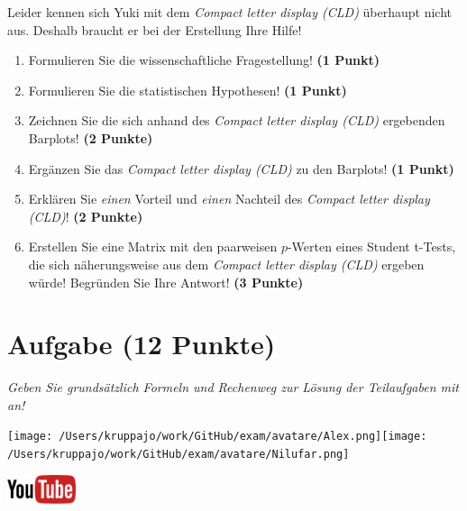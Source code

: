 \documentclass[a4paper, 9pt]{scrartcl}\usepackage[]{graphicx}\usepackage[]{xcolor}
\begin{document}
Leider kennen sich Yuki mit dem \textit{Compact letter display (CLD)} überhaupt nicht aus. Deshalb braucht er bei der Erstellung Ihre Hilfe!

\begin{enumerate}
  \item Formulieren Sie die wissenschaftliche Fragestellung! \textbf{(1 Punkt)}
  \item Formulieren Sie die statistischen Hypothesen! \textbf{(1 Punkt)}
\item Zeichnen Sie die sich anhand des \textit{Compact letter display (CLD)} ergebenden Barplots! \textbf{(2 Punkte)}
\item Ergänzen Sie das \textit{Compact letter display (CLD)} zu den Barplots! \textbf{(1 Punkt)}
\item Erklären Sie \textit{einen} Vorteil und \textit{einen} Nachteil des \textit{Compact letter display (CLD)}! \textbf{(2 Punkte)}
\item Erstellen Sie eine Matrix mit den paarweisen $p$-Werten eines Student t-Tests, die sich näherungsweise aus dem \textit{Compact letter display (CLD)} ergeben würde! Begründen Sie Ihre Antwort! \textbf{(3 Punkte)}
\end{enumerate}

 
\clearpage

\section{Aufgabe \hfill (12 Punkte)}

\textit{Geben Sie grundsätzlich Formeln und Rechenweg zur Lösung der Teilaufgaben mit an!} \\[1Ex]
 

 
\ifcollection
\begin{flushright}
\tiny\vspace{-3Ex}
\textbf{\examinhaltstart}
\exammodulebiostat
\vspace{-4Ex}
\end{flushright}
\begin{minipage}[t]{0.5\textwidth}
\texttt{[image: /Users/kruppajo/work/GitHub/exam/avatare/Alex.png]}\hspace{-4mm}\texttt{[image: /Users/kruppajo/work/GitHub/exam/avatare/Nilufar.png]}
\end{minipage}
\begin{minipage}[t]{0.5\textwidth}
\hfill
\href{https://youtu.be/kHmfEmU6lrk}{\includegraphics[width = 2cm]{img/youtube}}
\end{minipage}
\fi
\end{document}
